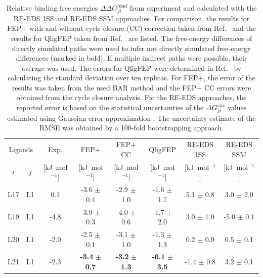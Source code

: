 \begin{table}[h]
\caption{Relative binding free energies $\Delta \Delta G^\text{bind}_{ji}$ from experiment and calculated with the RE-EDS 1SS and RE-EDS SSM approaches. For comparison, the results for FEP+ with and without cycle closure (CC) correction taken from Ref.~\cite{Wang2017} and the results for QligFEP taken from Ref.~\cite{Jespers2019} are listed. The free-energy differences of directly simulated paths were used to infer not directly simulated free-energy differences (marked in bold). If multiple indirect paths were possible, their average was used. The errors for QligFEP were determined in Ref.~\cite{Jespers2019} by calculating the standard deviation over ten replicas. For FEP+, the error of the results was taken from the used BAR \cite{Bennett1976} method and the FEP+ CC errors were obtained from the cycle closure analysis. For the RE-EDS approaches, the reported error is based on the statistical uncertainties of the $\Delta G_{ji}^{env}$ values estimated using Gaussian error approximation \cite{Christ2008}. The uncertainty estimate of the RMSE was obtained by a 100-fold bootstrapping approach. }
\begin{center}
\footnotesize
\begin{adjustbox}{max width=\textwidth}
\begin{tabular}{ c c |c |c|c|c|c|c}
  \multicolumn{2}{c|}{Ligands} & \multicolumn{1}{c|}{Exp. \cite{Huang2012}} &\multicolumn{1}{c|}{FEP+ \cite{Wang2017}}&\multicolumn{1}{c|}{FEP+ CC \cite{Wang2017}}&\multicolumn{1}{c|}{QligFEP \cite{Jespers2019}}&\multicolumn{1}{c|}{RE-EDS 1SS}&\multicolumn{1}{c}{RE-EDS SSM}\\ 
    $i$ & $j$  & [kJ~mol$^{-1}$]  & [kJ~mol$^{-1}$] & [kJ~mol$^{-1}$] & [kJ~mol$^{-1}$] & [kJ~mol$^{-1}$] & [kJ~mol$^{-1}$]  \\
  \hline
        L17 &  L1 &   0.1 & -3.6 $\pm$ 0.4          & -2.9 $\pm$ 1.0         & -1.6 $\pm$ 1.7                                     &    5.1 $\pm$ 0.8 &  3.0 $\pm$ 2.0 \\
        L19 &  L1 &  -4.8 & -3.9 $\pm$ 0.3          & -4.0 $\pm$ 0.6         & -1.7 $\pm$ 2.0                                     &    3.0 $\pm$ 1.0 & -5.0 $\pm$ 0.1\\
        L20 &  L1 &  -2.0 & -2.5 $\pm$ 0.1          & -3.1 $\pm$ 1.0         & -1.3 $\pm$ 1.3                                     &    0.2 $\pm$ 0.9 &  0.5 $\pm$ 0.1\\
        L21 &  L1 &  -2.3 &\textbf{-3.4} $\pm$ \textbf{0.7}  &\textbf{-3.2} $\pm$ \textbf{1.3} & \textbf{-0.1} $\pm$ \textbf{3.5} &   -1.4 $\pm$ 0.8 &  3.2 $\pm$ 0.1\\

\end{tabular}
\end{adjustbox}
\end{center}
\end{table}
